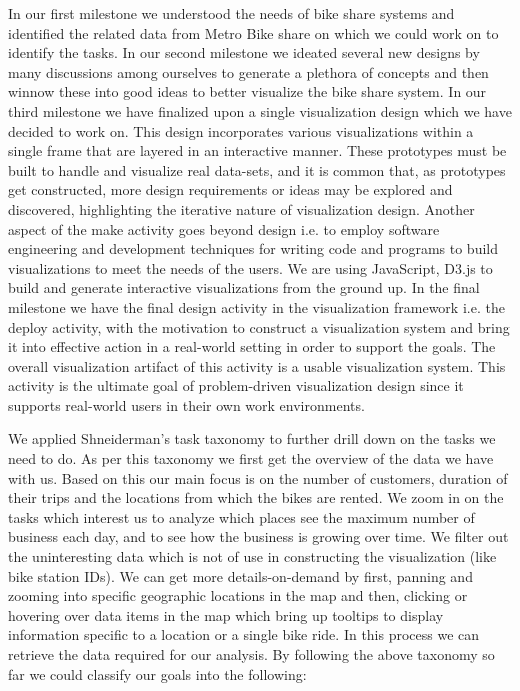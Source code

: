 In our first milestone we understood the needs of bike share systems and identified the related data from Metro Bike share on which we could work on to identify the tasks. In our second milestone we ideated several new designs by many discussions among ourselves to generate a plethora of concepts and then winnow these into good ideas to better visualize the bike share system. In our third milestone we have finalized upon a single visualization design which we have decided to work on. This design incorporates various visualizations within a single frame that are layered in an interactive manner. These prototypes must be built to handle and visualize real data-sets, and it is common that, as prototypes get constructed, more design requirements or ideas may be explored and discovered, highlighting the iterative nature of visualization design. Another aspect of the make activity goes beyond design i.e. to employ software engineering and development techniques for writing code and programs to build visualizations to meet the needs of the users. We are using JavaScript, D3.js to build and generate interactive visualizations from the ground up. In the final milestone we have the final design activity in the visualization framework i.e. the deploy activity, with the motivation to construct a visualization system and bring it into effective action in a real-world setting in order to support the goals. The overall visualization artifact of this activity is a usable visualization system. This activity is the ultimate goal of problem-driven visualization design since it supports real-world users in their own work environments. 

 We applied Shneiderman's task taxonomy\cite{Shneiderman:1996:Mantra} to further drill down on the tasks we need to do. As per this taxonomy we first get the overview of the data we have with us. Based on this our main focus is on the number of customers, duration of their trips and the locations from which the bikes are rented. We zoom in on the tasks which interest us to analyze which places see the maximum number of business each day, and to see how the business is growing over time. We filter out the uninteresting data which is not of use in constructing the visualization (like bike station IDs). We can get more details-on-demand by first, panning and zooming into specific geographic locations in the map and then, clicking or hovering over data items in the map which bring up tooltips to display information specific to a location or a single bike ride. In this process we can retrieve the data required for our analysis. By following the above taxonomy so far we could classify our goals into the following:

